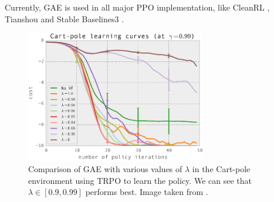 Currently, GAE is used in all major PPO implementation, like CleanRL \cite{huang2022cleanrl}, Tianshou \cite{tianshou} and Stable Baselines3 \cite{stable-baselines3}.
\begin{figure}[H]
    \centering
    \includegraphics[width=0.7\textwidth]{images/gae-comparison.png}
    \caption{Comparison of GAE with various values of $\lambda$ in the Cart-pole environment using TRPO to learn the policy. We can see that $\lambda \in [0.9, 0.99]$ performs best. Image taken from \cite{schulman2015high}.}
    \label{fig:gae-comparison}
\end{figure}